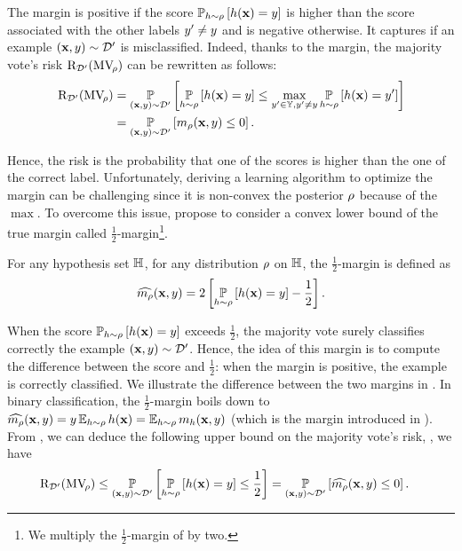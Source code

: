 The margin is positive if the score $\operatorname*{\mathbb{P}}_{h\sim\rho}\left[ h(\mathbf{x})=y \right]$ is higher than the score associated with the other labels $y'\ne y$ and is negative otherwise.
It captures if an example $(\mathbf{x},y)\sim\mathcal{D}'$ is misclassified.
Indeed, thanks to the margin, the majority vote's risk $\text{R}_{\mathcal{D}'}(\text{MV}_{\!\rho})$ can be rewritten as follows:
\begin{align*}
\text{R}_{\mathcal{D}'}(\text{MV}_{\!\rho}) &= \operatorname*{\mathbb{P}}_{(\mathbf{x},y)\sim\mathcal{D}'}\left[ \operatorname*{\mathbb{P}}_{h\sim\rho}\left[ h(\mathbf{x})=y \right] \le \max_{y'\in\mathbb{Y}, y'\ne y}\operatorname*{\mathbb{P}}_{h\sim\rho}\left[ h(\mathbf{x})=y' \right] \right]\\
&= \operatorname*{\mathbb{P}}_{(\mathbf{x},y)\sim\mathcal{D}'}\left[ m_{\rho}(\mathbf{x}, y) \le 0\right].
\end{align*}

Hence, the risk is the probability that one of the scores is higher than the one of the correct label.
Unfortunately, deriving a learning algorithm to optimize the margin can be challenging since it is non-convex \wrt the posterior $\rho$ because of the $\max$.
To overcome this issue, \citet{LavioletteMorvantRalaivolaRoy2017} propose to consider a convex lower bound of the true margin called $\frac{1}{2}$-margin\footnote{We multiply the $\frac{1}{2}$-margin of \citet{LavioletteMorvantRalaivolaRoy2017} by two.}.

\begin{definition}
For any hypothesis set $\mathbb{H}$, for any distribution $\rho$ on $\mathbb{H}$, the $\frac{1}{2}$-margin is defined as
\begin{align*}
    \widehat{m_{\rho}}(\mathbf{x},y) = 2\left[\operatorname*{\mathbb{P}}_{h\sim\rho}\left[ h(\mathbf{x})=y \right] - \frac{1}{2}\right].
\end{align*}
\label{chap:pac-bayes:def:1/2-margin}
\end{definition}

When the score $\operatorname*{\mathbb{P}}_{h\sim\rho}\left[ h(\mathbf{x})=y \right]$ exceeds $\frac{1}{2}$, the majority vote surely classifies correctly the example $(\mathbf{x}, y)\sim\mathcal{D}'$.
Hence, the idea of this margin is to compute the difference between the score and $\frac{1}{2}$: when the margin is positive, the example is correctly classified.
We illustrate the difference between the two margins in .
In binary classification, the $\frac{1}{2}$-margin boils down to $\widehat{m_{\rho}}(\mathbf{x},y) = y\operatorname*{\mathbb{E}}_{h\sim\rho}h(\mathbf{x}) = \operatorname*{\mathbb{E}}_{h\sim\rho}m_{h}(\mathbf{x},y)$ (which is the margin introduced in ).
From , we can deduce the following upper bound on the majority vote's risk, \ie, we have  
\begin{align*}
    \text{R}_{\mathcal{D}'}(\text{MV}_{\!\rho}) &\le \operatorname*{\mathbb{P}}_{(\mathbf{x},y)\sim\mathcal{D}'}\left[ \operatorname*{\mathbb{P}}_{h\sim\rho}\left[ h(\mathbf{x})=y \right] \le \frac{1}{2}\right] = \operatorname*{\mathbb{P}}_{(\mathbf{x},y)\sim\mathcal{D}'}\left[ \widehat{m_{\rho}}(\mathbf{x},y) \le 0\right].
\end{align*}

